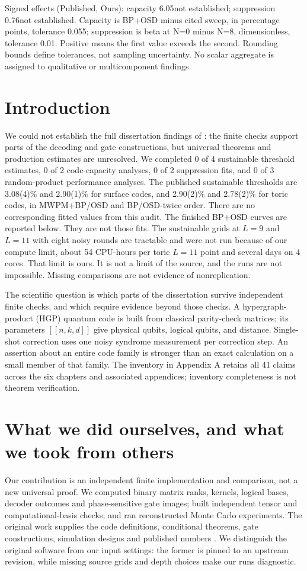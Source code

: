 Signed effects (Published, Ours): capacity 6.05\quad not established; suppression 0.76\quad not established.
Capacity is BP+OSD minus cited sweep, in percentage points, tolerance 0.055; suppression is beta at N=0 minus N=8, dimensionless, tolerance 0.01. Positive means the first value exceeds the second. Rounding bounds define tolerances, not sampling uncertainty. No scalar aggregate is assigned to qualitative or multicomponent findings.

\section{Introduction}
We could not establish the full dissertation findings of \citet{quintavalle2022}: the finite checks support parts of the decoding and gate constructions, but universal theorems and production estimates are unresolved. We completed 0 of 4 sustainable threshold estimates, 0 of 2 code-capacity analyses, 0 of 2 suppression fits, and 0 of 3 random-product performance analyses. The published sustainable thresholds are 3.08(4)\% and 2.90(1)\% for surface codes, and 2.90(2)\% and 2.78(2)\% for toric codes, in MWPM+BP/OSD and BP/OSD-twice order. There are no corresponding fitted values from this audit. The finished BP+OSD curves are reported below. They are not those fits. The sustainable grids at $L=9$ and $L=11$ with eight noisy rounds are tractable and were not run because of our compute limit, about 54 CPU-hours per toric $L=11$ point and several days on 4 cores. That limit is ours. It is not a limit of the source, and the runs are not impossible. Missing comparisons are not evidence of nonreplication.

The scientific question is which parts of the dissertation survive independent finite checks, and which require evidence beyond those checks. A hypergraph-product (HGP) quantum code is built from classical parity-check matrices; its parameters $[[n,k,d]]$ give physical qubits, logical qubits, and distance. Single-shot correction uses one noisy syndrome measurement per correction step. An assertion about an entire code family is stronger than an exact calculation on a small member of that family. The inventory in Appendix A retains all 41 claims across the six chapters and associated appendices; inventory completeness is not theorem verification.

\section{What we did ourselves, and what we took from others}
Our contribution is an independent finite implementation and comparison, not a new universal proof. We computed binary matrix ranks, kernels, logical bases, decoder outcomes and phase-sensitive gate images; built independent tensor and computational-basis checks; and ran reconstructed Monte Carlo experiments. The original work supplies the code definitions, conditional theorems, gate constructions, simulation designs and published numbers \citep{quintavalle2022}. We distinguish the original software from our input settings: the former is pinned to an upstream revision, while missing source grids and depth choices make our runs diagnostic.

